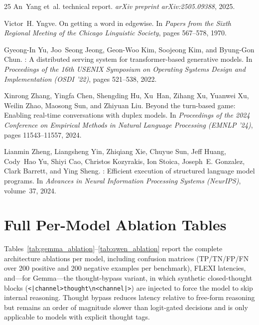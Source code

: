 \documentclass{article}
\begin{document}
\begin{thebibliography}{25}
An~Yang et~al.
 technical report.
\newblock \emph{arXiv preprint arXiv:2505.09388}, 2025.

Victor~H. Yngve.
\newblock On getting a word in edgewise.
\newblock In \emph{Papers from the Sixth Regional Meeting of the Chicago Linguistic Society}, pages 567--578, 1970.

Gyeong-In Yu, Joo~Seong Jeong, Geon-Woo Kim, Soojeong Kim, and Byung-Gon Chun.
: A distributed serving system for transformer-based generative models.
\newblock In \emph{Proceedings of the 16th USENIX Symposium on Operating Systems Design and Implementation (OSDI '22)}, pages 521--538, 2022.

Xinrong Zhang, Yingfa Chen, Shengding Hu, Xu~Han, Zihang Xu, Yuanwei Xu, Weilin Zhao, Maosong Sun, and Zhiyuan Liu.
\newblock Beyond the turn-based game: Enabling real-time conversations with duplex models.
\newblock In \emph{Proceedings of the 2024 Conference on Empirical Methods in Natural Language Processing (EMNLP '24)}, pages 11543--11557, 2024.

Lianmin Zheng, Liangsheng Yin, Zhiqiang Xie, Chuyue Sun, Jeff Huang, Cody~Hao Yu, Shiyi Cao, Christos Kozyrakis, Ion Stoica, Joseph~E. Gonzalez, Clark Barrett, and Ying Sheng.
: Efficient execution of structured language model programs.
\newblock In \emph{Advances in Neural Information Processing Systems (NeurIPS)}, volume~37, 2024.

\end{thebibliography}

\appendix

\section{Full Per-Model Ablation Tables}
\label{app:full_tables}

Tables~\ref{tab:gemma_ablation}--\ref{tab:qwen_ablation} report the complete architecture ablations per model, including confusion matrices (TP/TN/FP/FN over 200 positive and 200 negative examples per benchmark), FLEXI latencies, and---for Gemma---the thought-bypass variant, in which synthetic closed-thought blocks (\texttt{<|channel>thought\textbackslash n<channel|>}) are injected to force the model to skip internal reasoning. Thought bypass reduces latency relative to free-form reasoning but remains an order of magnitude slower than logit-gated decisions and is only applicable to models with explicit thought tags.
\end{document}
